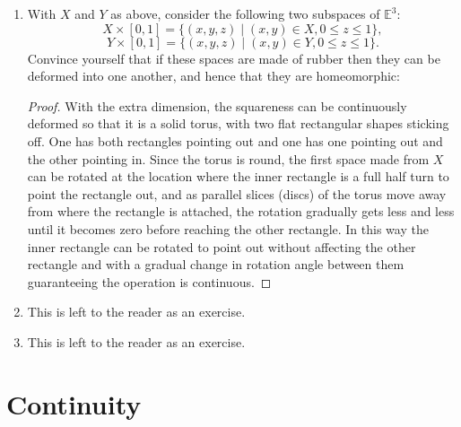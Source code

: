 \documentclass{book}
\begin{document}
\begin{enumerate}
    \item With $X$ and $Y$ as above, consider the following two subspaces of $\mathbb E^3$:
        $$X\times[0,1] = \{(x,y,z)\mid(x,y)\in X, 0\leq z\leq 1\},$$
        $$Y\times[0,1] = \{(x,y,z)\mid(x,y)\in Y, 0\leq z\leq 1\}.$$
        Convince yourself that if these spaces are made of rubber then they can be deformed into one another, and hence that they are homeomorphic: 
        \begin{proof}With the extra dimension, the squareness can be continuously deformed so that it is a solid torus, with two flat rectangular shapes sticking off.  One has both rectangles pointing out and one has one pointing out and the other pointing in.  Since the torus is round, the first space made from $X$ can be rotated at the location where the inner rectangle is a full half turn to point the rectangle out, and as parallel slices (discs) of the torus move away from where the rectangle is attached, the rotation gradually gets less and less until it becomes zero before reaching the other rectangle.  In this way the inner rectangle can be rotated to point out without affecting the other rectangle and with a gradual change in rotation angle between them guaranteeing the operation is continuous.
        \end{proof}

    \item This is left to the reader as an exercise.

    \item This is left to the reader as an exercise.

\end{enumerate}

\clearpage
\chapter{Continuity}
\end{document}
